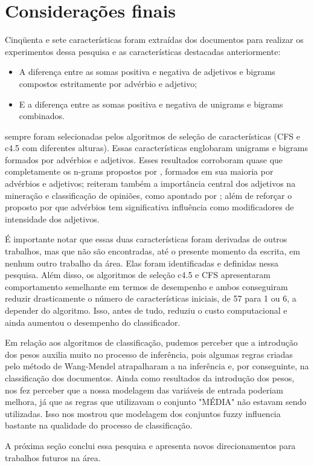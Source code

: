 \documentclass[template.tex]{subfiles}
\begin{document}
\section{Considerações finais}

Cinqüenta e sete características foram extraídas dos documentos para realizar os experimentos dessa pesquisa e as características destacadas anteriormente: 

\begin{itemize}
\item A diferença entre as somas positiva e negativa de adjetivos e bigrams compostos estritamente por advérbio e adjetivo;
\item E a diferença entre as somas positiva e negativa de unigrams e bigrams combinados.
\end{itemize}

sempre foram selecionadas pelos algoritmos de seleção de características (CFS e c4.5 com diferentes alturas). Essas características englobaram unigrams e bigrams formados por advérbios e adjetivos. Esses resultados corroboram quase que completamente os n-grams propostos por , formados em sua maioria por advérbios e adjetivos; reiteram também a importância central dos adjetivos na mineração e classificação de opiniões, como apontado por ; além de reforçar o proposto por  que advérbios tem significativa influência como modificadores de intensidade dos adjetivos. 

É importante notar que essas duas características foram derivadas de outros trabalhos, mas que não são encontradas, até o presente momento da escrita, em nenhum outro trabalho da área. Elas foram identificadas e definidas nessa pesquisa. Além disso, os algoritmos de seleção c4.5 e CFS apresentaram comportamento semelhante em termos de desempenho e ambos conseguiram reduzir drasticamente o número de características iniciais, de 57 para 1 ou 6, a depender do algoritmo. Isso, antes de tudo, reduziu o custo computacional e ainda aumentou o desempenho do classificador. 

Em relação aos algoritmos de classificação, pudemos perceber que a introdução dos pesos auxilia muito no processo de inferência, pois algumas regras criadas pelo método de Wang-Mendel atrapalharam a na inferência e, por conseguinte, na classificação dos documentos. Ainda como resultados da introdução dos pesos, nos fez perceber que a nossa modelagem das variáveis de entrada poderiam melhora, já que as regras que utilizavam o conjunto "MÉDIA" não estavam sendo utilizadas. Isso nos mostrou que modelagem dos conjuntos fuzzy influencia bastante na qualidade do processo de classificação.

A próxima seção conclui essa pesquisa e apresenta novos direcionamentos para trabalhos futuros na área.
\end{document}
